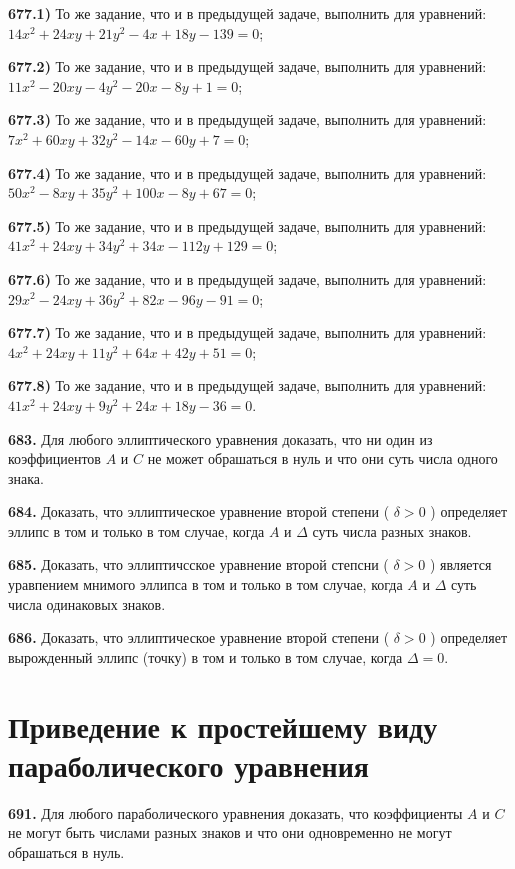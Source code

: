 \textbf{677.1)} То же задание, что и в предыдущей задаче, выполнить для уравнений: $14 x^2+24 x y+21 y^2-4 x+18 y-139=0$;

\textbf{677.2)} То же задание, что и в предыдущей задаче, выполнить для уравнений: $11 x^2-20 x y-4 y^2-20 x-8 y+1=0$;

\textbf{677.3)} То же задание, что и в предыдущей задаче, выполнить для уравнений: $7 x^2+60 x y+32 y^2-14 x-60 y+7=0$;

\textbf{677.4)} То же задание, что и в предыдущей задаче, выполнить для уравнений: $50 x^2-8 x y+35 y^2+100 x-8 y+67=0$;

\textbf{677.5)} То же задание, что и в предыдущей задаче, выполнить для уравнений: $41 x^2+24 x y+34 y^2+34 x-112 y+129=0$;

\textbf{677.6)} То же задание, что и в предыдущей задаче, выполнить для уравнений: $29 x^2-24 x y+36 y^2+82 x-96 y-91=0$;

\textbf{677.7)} То же задание, что и в предыдущей задаче, выполнить для уравнений: $4 x^2+24 x y+11 y^2+64 x+42 y+51=0$;

\textbf{677.8)} То же задание, что и в предыдущей задаче, выполнить для уравнений: $41 x^2+24 x y+9 y^2+24 x+18 y-36=0$.

\textbf{683.} Для любого эллиптического уравнения доказать, что ни один из коэффициентов $A$ и $C$ не может обрашаться в нуль и что они суть числа одного знака.

\textbf{684.} Доказать, что эллиптическое уравнение второй степени ( $\delta>0$ ) определяет эллипс в том и только в том случае, когда $A$ и $\Delta$ суть числа разных знаков.

\textbf{685.} Доказать, что эллиптичсское уравнение второй степсни ( $\delta>0$ ) является уравпением мнимого эллипса в том и только в том случае, когда $A$ и $\Delta$ суть числа одинаковых знаков.

\textbf{686.} Доказать, что эллиптическое уравнение второй степени ( $\delta>0$ ) определяет вырожденный эллипс (точку) в том и только в том случае, когда $\Delta=0$.



\section{Приведение к простейшему виду параболического уравнения}



\textbf{691.} Для любого параболического уравнения доказать, что коэффициенты $A$ и $C$ не могут быть числами разных знаков и что они одновременно не могут обрашаться в нуль.

